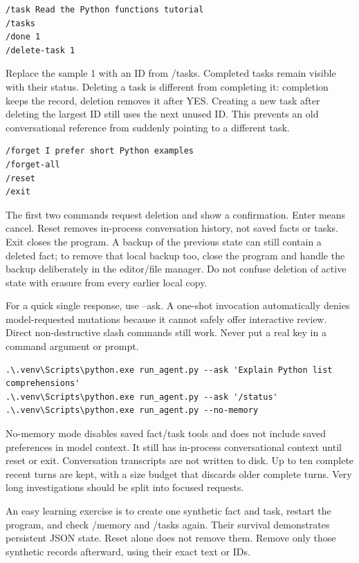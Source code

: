 \begin{Verbatim}[breaklines,breakanywhere,fontsize=\small]
/task Read the Python functions tutorial
/tasks
/done 1
/delete-task 1
\end{Verbatim}

Replace the sample 1 with an ID from /tasks. Completed tasks remain visible with their status. Deleting a task is different from completing it: completion keeps the record, deletion removes it after YES. Creating a new task after deleting the largest ID still uses the next unused ID. This prevents an old conversational reference from suddenly pointing to a different task.

\begin{Verbatim}[breaklines,breakanywhere,fontsize=\small]
/forget I prefer short Python examples
/forget-all
/reset
/exit
\end{Verbatim}

The first two commands request deletion and show a confirmation. Enter means cancel. Reset removes in-process conversation history, not saved facts or tasks. Exit closes the program. A backup of the previous state can still contain a deleted fact; to remove that local backup too, close the program and handle the backup deliberately in the editor/file manager. Do not confuse deletion of active state with erasure from every earlier local copy.

For a quick single response, use --ask. A one-shot invocation automatically denies model-requested mutations because it cannot safely offer interactive review. Direct non-destructive slash commands still work. Never put a real key in a command argument or prompt.

\begin{Verbatim}[breaklines,breakanywhere,fontsize=\small]
.\.venv\Scripts\python.exe run_agent.py --ask 'Explain Python list comprehensions'
.\.venv\Scripts\python.exe run_agent.py --ask '/status'
.\.venv\Scripts\python.exe run_agent.py --no-memory
\end{Verbatim}

No-memory mode disables saved fact/task tools and does not include saved preferences in model context. It still has in-process conversational context until reset or exit. Conversation transcripts are not written to disk. Up to ten complete recent turns are kept, with a size budget that discards older complete turns. Very long investigations should be split into focused requests.

An easy learning exercise is to create one synthetic fact and task, restart the program, and check /memory and /tasks again. Their survival demonstrates persistent JSON state. Reset alone does not remove them. Remove only those synthetic records afterward, using their exact text or IDs.

